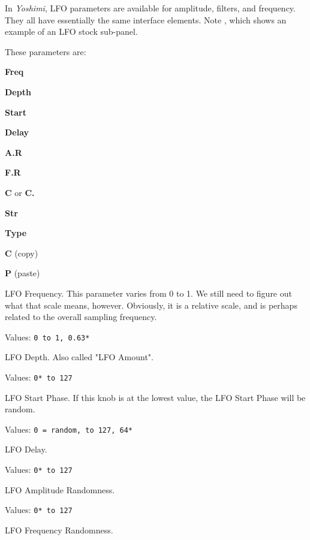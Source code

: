    In \textsl{Yoshimi}, LFO parameters are available for amplitude, filters,
   and frequency.  They all have essentially the same interface elements.
   Note , which
   shows an example of an LFO stock sub-panel.

These parameters are:

   \begin{enumber}
      \item \textbf{Freq}
      \item \textbf{Depth}
      \item \textbf{Start}
      \item \textbf{Delay}
      \item \textbf{A.R}
      \item \textbf{F.R}
      \item \textbf{C} or \textbf{C.}
      \item \textbf{Str}
      \item \textbf{Type}
      \item \textbf{C} (copy)
      \item \textbf{P} (paste)
   \end{enumber}

   \setcounter{ItemCounter}{0}      %

   LFO Frequency.
   This parameter varies from 0 to 1.
   We still need to figure out what that scale means, however.
   Obviously, it is a relative scale, and is perhaps related to the
   overall sampling frequency.

   Values: \texttt{0 to 1, 0.63*}

   LFO Depth.  Also called "LFO Amount".

   Values: \texttt{0* to 127}

   LFO Start Phase. If this knob is at the lowest value, the LFO Start
   Phase will be random.

   Values: \texttt{0 = random, to 127, 64*}

   LFO Delay.

   Values: \texttt{0* to 127}

   LFO Amplitude Randomness.

   Values: \texttt{0* to 127}

   LFO Frequency Randomness.

